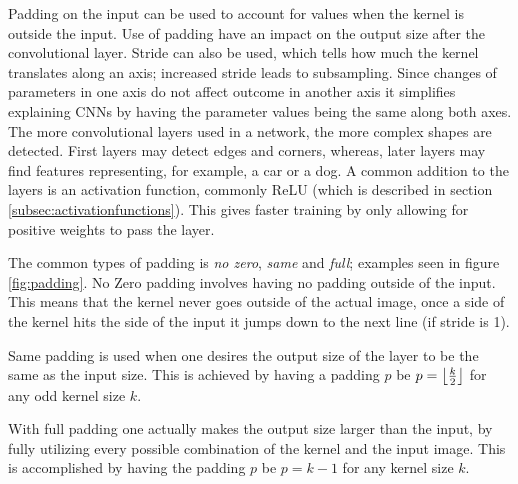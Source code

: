 Padding on the input can be used to account for values when the kernel is outside the input. Use of padding have an impact on the output size after the convolutional layer. Stride can also be used, which tells how much the kernel translates along an axis;  increased stride leads to subsampling. Since changes of parameters in one axis do not affect outcome in another axis it simplifies explaining CNNs by having the parameter values being the same along both axes. The more convolutional layers used in a network, the more complex shapes are detected. First layers may detect edges and corners, whereas, later layers may find features representing, for example, a car or a dog. A common addition to the layers is an activation function, commonly ReLU (which is described in section \ref{subsec:activationfunctions}). This gives faster training by only allowing for positive weights to pass the layer.

 The common types of padding is \textit{no zero}, \textit{same} and \textit{full}; examples seen in figure \ref{fig:padding}. No Zero padding involves having no padding outside of the input. This means that the kernel never goes outside of the actual image, once a side of the kernel hits the side of the input it jumps down to the next line (if stride is 1). 
 
 Same padding is used when one desires the output size of the layer to be the same as the input size. This is achieved by having a padding $p$ be $ p = \left\lfloor \frac{k}{2} \right\rfloor $ for any odd kernel size $k$.
  
 With full padding one actually makes the output size larger than the input, by fully utilizing every possible combination of the kernel and the input image. This is accomplished  by having the padding $p $ be $p = k - 1$ for any kernel size $k$. 
 
